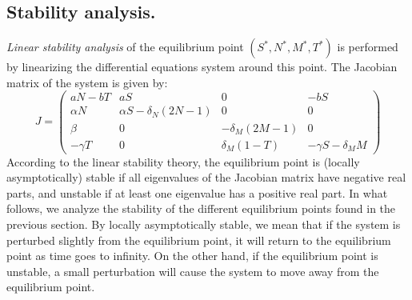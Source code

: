\documentclass[a4paper, 12pt]{article}
\begin{document}
\subsection{Stability analysis.}
\emph{Linear stability analysis} of the equilibrium point $ (S^*, N^*, M^*, T^*)$ is performed by linearizing the differential equations system around this point.
The Jacobian matrix of the system is given by:
\[
J = \begin{pmatrix}
aN - bT & aS & 0 & -bS \\
\alpha N & \alpha S - \delta_N (2N-1) & 0 & 0 \\
\beta & 0 & -\delta_M (2M-1) & 0 \\
-\gamma T & 0 & \delta_M (1-T) & -\gamma S - \delta_M M
\end{pmatrix}
\]
According to the linear stability theory, the equilibrium point is (locally asymptotically) stable if all eigenvalues of the Jacobian matrix have negative real parts, and unstable if at least one eigenvalue has a positive real part. In what follows,
 we analyze the stability of the different equilibrium points found in the previous section. By locally asymptotically stable, we mean that if the system is perturbed slightly from the equilibrium point, it will return to the equilibrium point as time goes to infinity. On the other hand, if the equilibrium point is unstable, a small perturbation will cause the system to move away from the equilibrium point.
\end{document}

